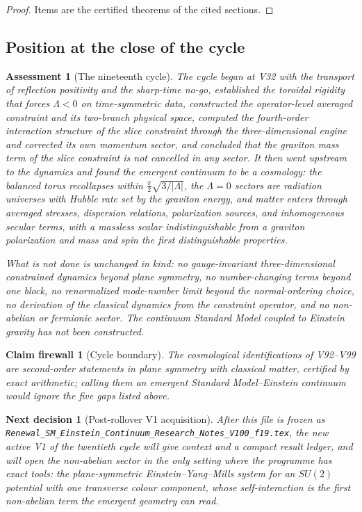 \documentclass[11pt]{article}
\newtheorem{firewall}[theorem]{Claim firewall}
\newtheorem{decision}[theorem]{Next decision}
\newtheorem{assessment}[theorem]{Assessment}
\theoremstyle{remark}
\begin{document}
\begin{proof}
Items are the certified theorems of the cited sections.
\end{proof}

\subsection{Position at the close of the cycle}

\begin{assessment}[The nineteenth cycle]
\label{ass:v19v100-cycle}
The cycle began at V32 with the transport of reflection positivity and
the sharp-time no-go, established the toroidal rigidity that forces
\(\Lambda<0\) on time-symmetric data, constructed the operator-level
averaged constraint and its two-branch physical space, computed the
fourth-order interaction structure of the slice constraint through
the three-dimensional engine and corrected its own momentum sector,
and concluded that the graviton mass term of the slice constraint is
not cancelled in any sector.  It then went upstream to the dynamics
and found the emergent continuum to be a cosmology: the balanced torus
recollapses within \(\tfrac\pi2\sqrt{3/|\Lambda|}\), the \(\Lambda=0\)
sectors are radiation universes with Hubble rate set by the graviton
energy, and matter enters through averaged stresses, dispersion
relations, polarization sources, and inhomogeneous secular terms, with
a massless scalar indistinguishable from a graviton polarization and
mass and spin the first distinguishable properties.

What is not done is unchanged in kind: no gauge-invariant
three-dimensional constrained dynamics beyond plane symmetry, no
number-changing terms beyond one block, no renormalized mode-number
limit beyond the normal-ordering choice, no derivation of the
classical dynamics from the constraint operator, and no non-abelian
or fermionic sector.  The continuum Standard Model coupled to
Einstein gravity has not been constructed.
\end{assessment}

\begin{firewall}[Cycle boundary]
\label{fire:v19v100}
The cosmological identifications of V92--V99 are second-order
statements in plane symmetry with classical matter, certified by
exact arithmetic; calling them an emergent Standard Model--Einstein
continuum would ignore the five gaps listed above.
\end{firewall}

\begin{decision}[Post-rollover V1 acquisition]
\label{dec:v19v100-next}
After this file is frozen as
\texttt{Renewal\_SM\_Einstein\_Continuum\_Research\_Notes\_V100\_f19.tex},
the new active V1 of the twentieth cycle will give context and a
compact result ledger, and will open the non-abelian sector in the
only setting where the programme has exact tools: the plane-symmetric
Einstein--Yang--Mills system for an \(SU(2)\) potential with one
transverse colour component, whose self-interaction is the first
non-abelian term the emergent geometry can read.
\end{decision}
\end{document}
